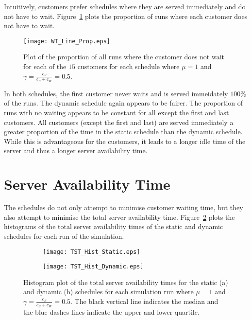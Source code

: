 Intuitively, customers prefer schedules where they are served immediately and do not have to wait. Figure~\ref{fig:No_Wait_Position} plots the proportion of runs where each customer does not have to wait.
\begin{figure}[htb]
	\centering
	\texttt{[image: WT\_Line\_Prop.eps]}
	\caption{Plot of the proportion of all runs where the customer does not wait for each of the $15$ customers for each schedule where $\mu = 1$ and $\gamma = \frac{c_{S}}{c_{S} + c_{W}} = 0.5$.}
	\label{fig:No_Wait_Position}
\end{figure}

In both schedules, the first customer never waits and is served immeidately $100 \%$ of the runs. The dynamic schedule again appears to be fairer. The proportion of runs with no waiting appears to be constant for all except the first and last customers. All customers (except the first and last) are served immediately a greater proportion of the time in the static schedule than the dynamic schedule. While this is advantageous for the customers, it leads to a longer idle time of the server and thus a longer server availability time.

\section{Server Availability Time}
The schedules do not only attempt to minimise customer waiting time, but they also attempt to minimise the total server availability time. Figure~\ref{fig:Two_Server} plots the histograms of the total server availability times of the static and dynamic schedules for each run of the simulation.
\begin{figure}[htb]
	\centering
	\begin{subfigure}[t]{0.45\textwidth}
		\centering
		\texttt{[image: TST\_Hist\_Static.eps]}
		\caption{}
	\end{subfigure}
	\begin{subfigure}[t]{0.45\textwidth}
		\centering
		\texttt{[image: TST\_Hist\_Dynamic.eps]}
		\caption{}
	\end{subfigure}
	\caption{Histogram plot of the total server availability times for the static (a) and dynamic (b) schedules for each simulation run where $\mu = 1$ and $\gamma = \frac{c_{S}}{c_{S} + c_{W}} = 0.5$. The black vertical line indicates the median and the blue dashes lines indicate the upper and lower quartile.}
	\label{fig:Two_Server}
\end{figure}

